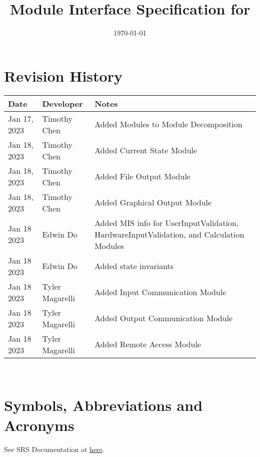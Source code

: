 \documentclass[12pt, titlepage]{article}
\begin{document}
\title{Module Interface Specification for \progname{}}

\author{\authname}

\date{\today}

\maketitle


\section{Revision History}

\begin{tabularx}{\textwidth}{p{3cm}p{2cm}X}
\toprule {\bf Date} & {\bf Developer} & {\bf Notes}\\
\midrule
Jan 17, 2023 & Timothy Chen & Added Modules to Module Decomposition\\
Jan 18, 2023 & Timothy Chen & Added Current State Module \\
Jan 18, 2023 & Timothy Chen & Added File Output Module \\
Jan 18, 2023 & Timothy Chen & Added Graphical Output Module \\
Jan 18 2023 & Edwin Do & Added MIS info for UserInputValidation, HardwareInputValidation, and Calculation Modules\\
Jan 18 2023 & Edwin Do & Added state invariants\\
Jan 18 2023 & Tyler Magarelli & Added Input Communication Module\\
Jan 18 2023 & Tyler Magarelli & Added Output Communication Module\\
Jan 18 2023 & Tyler Magarelli & Added Remote Access Module\\
\bottomrule
\end{tabularx}

~\newpage

\section{Symbols, Abbreviations and Acronyms}

See SRS Documentation at \href{https://github.com/edwin-do/capstoneTeam30/blob/main/docs/SRS/SRS.pdf}{here}.


\newpage

\tableofcontents
\end{document}
